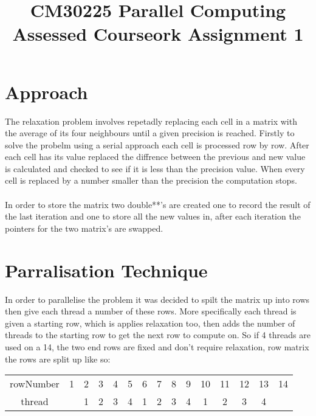 \documentclass{article}
\begin{document}
\title{CM30225 Parallel Computing \\ Assessed Courseork Assignment 1}
\author{}

\maketitle

\section{Approach}
The relaxation problem involves repetadly replacing each cell in a matrix with the
average of its four neighbours until a given precision is reached. Firstly to solve
the probelm using a serial approach each cell is processed row by row. After each
cell has its value replaced the diffrence between the previous and new value is
calculated and checked to see if it is less than the precision value. When every
cell is replaced by a number smaller than the precision the computation stops.\\~\\
In order to store the matrix two double**'s are created one to record the result of
the last iteration and one to store all the new values in, after each iteration the
pointers for the two matrix's are swapped.


\section{Parralisation Technique}
In order to parallelise the problem it was decided to spilt the matrix up into rows
then give each thread a number of these rows. More specifically each thread is
given a starting row, which is applies relaxation too, then adds the number of
threads to the starting row to get the next row to compute on. So if 4 threads
are used on a 14, the two end rows are fixed and don't require relaxation,
row matrix the rows are split up like so:

\begin{center}
\begin{tabular}{ |c|c|c|c|c|c|c|c|c|c|c|c|c|c|c| }
 \hline
 rowNumber & 1 & 2 & 3 & 4 & 5 & 6 & 7 & 8 & 9 & 10 & 11 & 12 & 13 & 14 \\
 thread &  & 1 & 2 & 3 & 4 & 1 & 2 & 3 & 4 & 1 & 2 & 3 & 4 &  \\
 \hline
\end{tabular}
\end{center}
\end{document}
